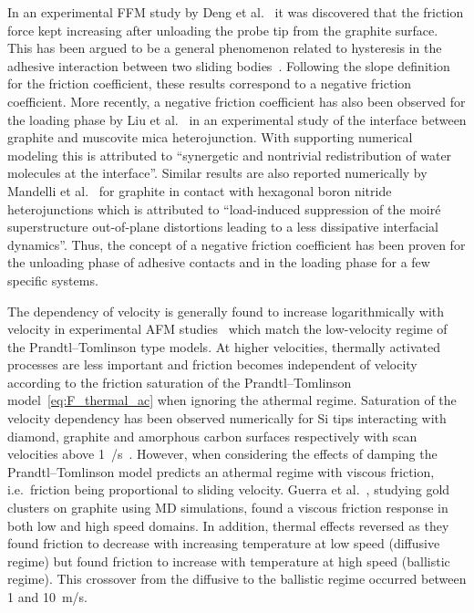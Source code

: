 In an experimental \acrshort{FFM} study by Deng et al.~\cite{deng_adhesion-dependent_2012} it was discovered that
the friction force kept increasing after unloading the probe tip from the
graphite surface. This has been argued to be a general phenomenon
related to hysteresis in the adhesive interaction between two sliding bodies~\cite{thormann_negative_2013}. Following the slope definition for the friction
coefficient, these results correspond to a negative friction coefficient. More recently, a negative friction coefficient has also been observed for the loading phase by Liu et al.~\cite{Liu_2020} in an experimental study of the interface between graphite and muscovite mica heterojunction. With supporting numerical modeling this is attributed to ``synergetic and nontrivial redistribution of water molecules at the interface''. Similar results are also reported numerically by Mandelli et al.~\cite{Mandelli_2019} for graphite in contact with hexagonal boron nitride heterojunctions which is attributed to ``load-induced suppression of the moiré superstructure out-of-plane distortions leading to a less dissipative interfacial dynamics''. Thus, the concept of a negative friction coefficient has been proven for the unloading phase of adhesive contacts and in the loading phase for a few specific systems. 

The dependency of velocity is generally found to increase logarithmically with
velocity in experimental \acrshort{AFM} studies~\cite[p. 201]{gnecco_meyer_2015}
which match the low-velocity regime of the Prandtl–Tomlinson type models. At
higher velocities, thermally activated processes are less important and friction
becomes independent of velocity according to the friction saturation of the Prandtl–Tomlinson model~\cref{eq:F_thermal_ac} when ignoring the athermal regime. Saturation of the
velocity dependency has been observed numerically for Si tips interacting with
diamond, graphite and amorphous carbon surfaces respectively with scan
velocities above \SI{1}{\mu/s}~\cite{zworner1998velocity}. However, when
considering the effects of damping the Prandtl–Tomlinson model predicts an
athermal regime with viscous friction, i.e.\ friction being proportional to
sliding velocity. Guerra et al.~\cite{Guerra_2010}, studying gold clusters on
graphite using \acrshort{MD} simulations, found a viscous friction response in
both low and high speed domains. In addition, thermal effects reversed as they found
friction to decrease with increasing temperature at low speed (diffusive regime)
but found friction to increase with temperature at high speed (ballistic
regime). This crossover from the diffusive to the ballistic regime occurred between 1 and \SI{10}{m/s}. 


